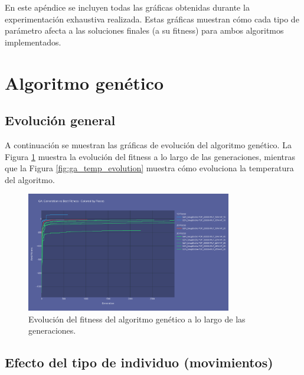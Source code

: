 \documentclass[11pt,spanish,listoffigures,listoftables]{tfgetsinf}
\begin{document}
En este apéndice se incluyen todas las gráficas obtenidas durante la experimentación exhaustiva realizada. Estas gráficas muestran cómo cada tipo de parámetro afecta a las soluciones finales (a su fitness) para ambos algoritmos implementados.

\section{Algoritmo genético}

\subsection{Evolución general}

A continuación se muestran las gráficas de evolución del algoritmo genético. La Figura \ref{fig:ga_evolution} muestra la evolución del fitness a lo largo de las generaciones, mientras que la Figura \ref{fig:ga_temp_evolution} muestra cómo evoluciona la temperatura del algoritmo.

\begin{figure}[H]
    \centering
    \includegraphics[width=0.8\textwidth]{images/GA_evolution.png}
    \caption{Evolución del fitness del algoritmo genético a lo largo de las generaciones.}
    \label{fig:ga_evolution}
\end{figure}


\subsection{Efecto del tipo de individuo (movimientos)}
\end{document}

